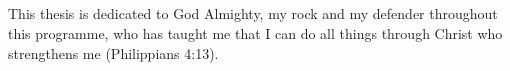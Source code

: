 \begin{titlepage}
\section*{\Huge{}}
\vspace{1cm}
\large

This thesis is dedicated to God Almighty, my rock and my defender throughout this programme, who has taught me that I can do all things through Christ who strengthens me (Philippians 4:13).

\end{titlepage}
